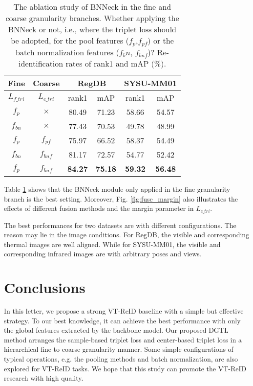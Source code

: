 \documentclass[journal]{IEEEtran}
\begin{document}
\begin{table}
\scriptsize
\caption{The ablation study of BNNeck \cite{Luo2019ASB} in the fine and coarse granularity branches. Whether applying the BNNeck or not, i.e., where the triplet loss should be adopted, for the pool features ($f_p$,$f_{pf}$)  or the batch normalization features ($f_bn$, $f_{bnf}$)? Re-identification rates of rank1 and mAP (\%).}
\label{tab:ablation_bnneck}
  \centering
\begin{tabular}{c|c|c|c|c|c}
   \toprule[2pt]
    Fine & Coarse & \multicolumn{2}{c|}{RegDB} & \multicolumn{2}{c}{SYSU-MM01}\\ \hline
     $L_{f\_tri}$ & $L_{c\_tri}$ &  rank1 & mAP & rank1 & mAP \\ \toprule[1pt]
     $f_p$ & $\times$ &  80.49  & 71.23 & 58.66 & 54.57  \\
     $f_{bn}$ & $\times$ &  77.43  & 70.53 & 49.78 & 48.99   \\
     $f_p$ & $f_{pf}$ & 75.97  & 66.52 & 58.37 & 54.49     \\
     $f_{bn}$ & $f_{bnf}$ & 81.17  & 72.57 & 54.77 & 52.42  \\
     $f_p$ & $f_{bnf}$ & \textbf{84.27}  & \textbf{75.18} & \textbf{59.32} &  \textbf{56.48}   \\
     \toprule[2pt]
  \end{tabular}
\end{table}

Table \ref{tab:ablation_bnneck} shows that the BNNeck \cite{Luo2019ASB} module only applied in the fine granularity branch is the best setting.
Moreover, Fig. \ref{fig:fuse_margin} also illustrates the effects of different fusion methods and the margin parameter in $L_{c\_tri}$.

The best performances for two datasets are with different configurations. The reason may lie in the image conditions. For RegDB, the visible and corresponding thermal images are well aligned. While for SYSU-MM01, the visible and corresponding infrared images are with arbitrary poses and views.

\section{Conclusions}
In this letter, we propose a strong VT-ReID baseline with a simple but effective strategy. To our best knowledge, it can achieve the best performance with only the global features extracted by the backbone model.
Our proposed DGTL method arranges the sample-based triplet loss and center-based triplet loss in a hierarchical fine to coarse granularity manner. Some simple configurations of typical operations, e.g. the pooling methods and batch normalization, are also explored for VT-ReID tasks.
We hope that this study can promote the VT-ReID research with high quality.





\end{document}
